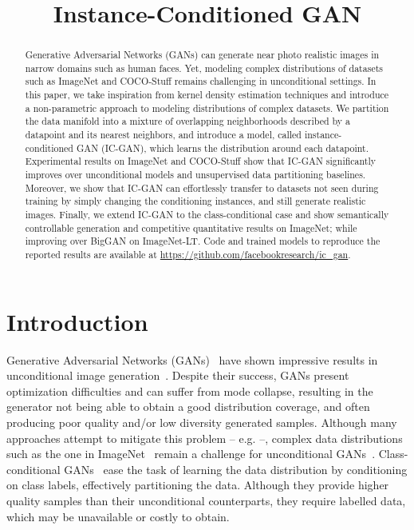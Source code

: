 \title{Instance-Conditioned GAN}

\begin{abstract}
Generative Adversarial Networks (GANs) can generate near photo realistic images  in narrow  domains such as human faces. Yet, modeling complex distributions of datasets such as ImageNet and COCO-Stuff remains challenging in unconditional settings. In this paper, we take inspiration from kernel density estimation techniques and introduce a non-parametric approach to modeling distributions of complex datasets. We partition the data manifold into a mixture of overlapping neighborhoods described by a datapoint and its nearest neighbors, and introduce a model, called instance-conditioned GAN ({IC-GAN}), which learns the distribution around each datapoint. Experimental results on ImageNet and COCO-Stuff show that {IC-GAN} significantly improves over unconditional models and unsupervised data partitioning baselines. Moreover, we show that  {IC-GAN} can effortlessly transfer to datasets not seen during training by simply changing the conditioning instances, and still generate realistic images. Finally, we extend {IC-GAN} to the class-conditional case and show semantically controllable generation and competitive quantitative results on ImageNet; while improving over BigGAN  on ImageNet-LT. Code and trained models  to reproduce the reported results are available at \url{https://github.com/facebookresearch/ic_gan}.
\end{abstract}

\section{Introduction}
Generative Adversarial Networks (GANs)~\cite{goodfellow2014generative} have  shown impressive results in unconditional image generation~\cite{karras2019stylebased, Karras2019stylegan2}. Despite their success, GANs present optimization difficulties and can suffer from mode collapse, resulting in the generator not being able to obtain a good distribution coverage, and often producing poor quality and/or low diversity generated samples. Although many approaches attempt to mitigate this problem -- e.g. \cite{gulrajani2017improved,lin2018pacgan,lucas18icml,metz2016unrolled} --, complex data distributions such as the one in ImageNet~\cite{ILSVRC15} remain a challenge for unconditional GANs~\cite{liu2020diverse,pmlr-v97-lucic19a}. Class-conditional GANs~\cite{brock2018large,mirza2014conditional, miyato2018spectral, zhang2019self} ease the task of learning the data distribution by conditioning on class labels, effectively partitioning the data. Although they provide higher quality samples than their unconditional counterparts, they require labelled data, which may be unavailable or costly to obtain.

